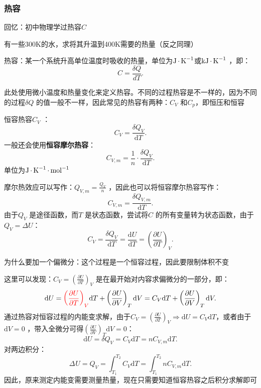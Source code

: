\subsubsection*{热容}%
\label{subsub:热容}
回忆：初中物理学过热容$C$ 
\begin{eg}
    有一些300K的水，求将其升温到400K需要的热量（反之同理）
\end{eg}
\begin{defi}
    热容：某一个系统升高单位温度时吸收的热量，单位为$\ce{J*K^{-1}}$或$\ce{kJ*K^{-1}}$ ，即：\[\boxed{
        C = \frac{\delta Q}{dT}
    .}\]
\end{defi}
此处使用微小温度和热量变化来定义热容。不同的过程热容是不一样的，因为不同的过程$\delta Q$ 的值一般不一样，因此常见的热容有两种：$C_{V}$ 和$C_{p}$，即恒压和恒容
\begin{defi}
    恒容热容$C_{V}$ ：\[
        C_{V} = \frac{\delta Q_{V}}{\mathrm{d}T}
    .\]
    一般还会使用\textbf{恒容摩尔热容}：\[
        C_{V,m} = \frac{1}{n}\cdot \frac{\delta Q_{V}}{\mathrm{d}T}
    .\]
    单位为$\ce{J*K^{-1}*mol^{-1}}$
\end{defi}
摩尔热效应可以写作：$Q_{V,m} = \frac{Q_{V}}{n}$ ，因此也可以将恒容摩尔热容写作：\[
    C_{V,m} = \frac{\delta Q_{V,m}}{\mathrm{d}T}
.\]
由于$Q_{V}$ 是途径函数，而$T$ 是状态函数，尝试将$C$ 的所有变量转为状态函数，由于$Q_{V}=\Delta U$：\[
    C_{V} = \frac{\delta Q_{V}}{\mathrm{d}T} = \frac{\mathrm{d}U}{\mathrm{d}T} = \left(\frac{\partial U}{\partial T}\right)_{V}
.\]
\begin{notation}
    为什么要加一个偏微分：这个过程是一个恒容过程，因此要限制体积不变
\end{notation}
这里可以发现：$C_{V} = \left(\frac{\partial U}{\partial T}\right)_{V}$ 是在最开始对内容求偏微分的一部分，即：\[
    \mathrm{d}U = \textcolor{red}{\left(\frac{\partial U}{\partial T}\right)_{V}}\mathrm{d}T + \left(\frac{\partial U}{\partial V}\right)_{T}\mathrm{d}V = C_{V}\mathrm{d}T + \left(\frac{\partial U}{\partial V}\right)_{T}\mathrm{d}V
.\]
通过热容对恒容过程的内能变求解，由于$C_{V} = \left(\frac{\partial U}{\partial T}\right)_{V}\Rightarrow \mathrm{d}U = C_{V}\mathrm{d}T$，或者由于$\mathrm{d}V=0$ ，带入全微分可得$\left(\frac{\partial U}{\partial V}\right)_{T}\mathrm{d}V = 0$：\[
    \mathrm{d}U = \delta Q_{V} = C_{V}\mathrm{d}T = nC_{V,m}\mathrm{d}T
.\]
对两边积分：\[
    \Delta_\text{}U = Q_{V} = \int_{T_1}^{T_2} C_{V} \mathrm{d}T = \int_{T_1}^{T_2} nC_{V,m} \mathrm{d}T
.\]
因此，原来测定内能变需要测量热量，现在只需要知道恒容热容之后积分求解即可

